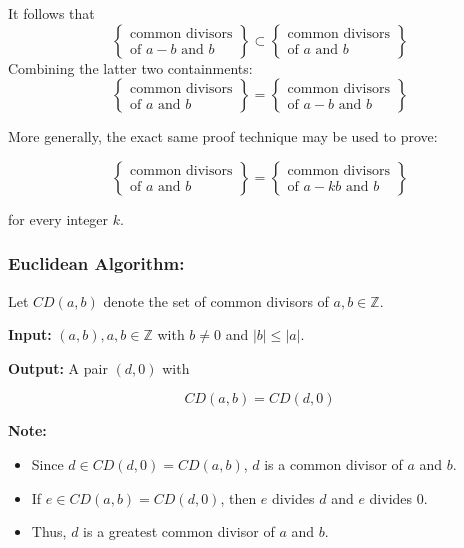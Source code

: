 \documentclass[11pt]{article}
\begin{document}
It follows that
\[
    \left\{
    \begin{array}{l}
        \text{common divisors} \\
        \text{of } a - b \text{ and } b
    \end{array}
    \right\}
    \subset
    \left\{
    \begin{array}{l}
        \text{common divisors} \\
        \text{of } a \text{ and } b
    \end{array}
    \right\}
\]
Combining the latter two containments:
\[
    \left\{
    \begin{array}{l}
        \text{common divisors} \\
        \text{of } a \text{ and } b
    \end{array}
    \right\}
    =
    \left\{
    \begin{array}{l}
        \text{common divisors} \\
        \text{of } a - b \text{ and } b
    \end{array}
    \right\}
\]

More generally, the exact same proof technique may be used to prove:

\[
    \left\{
    \begin{array}{l}
        \text{common divisors} \\
        \text{of } a \text{ and } b
    \end{array}
    \right\}
    =
    \left\{
    \begin{array}{l}
        \text{common divisors} \\
        \text{of } a - kb \text{ and } b
    \end{array}
    \right\}
\]

for every integer $k$.

\subsubsection{Euclidean Algorithm:}

Let $CD(a, b)$ denote the set of common divisors of $a, b \in \mathbb{Z}$.

\textbf{Input:} $(a, b), a, b \in \mathbb{Z}$ with $b \neq 0$ and $|b| \leq |a|$.

\textbf{Output:} A pair $(d, 0)$ with

\[
    CD(a, b) = CD(d, 0)
\]

\textbf{Note:}
\begin{itemize}
    \item Since $d \in CD(d, 0) = CD(a, b)$, $d$ is a common divisor of $a$ and $b$.
    \item If $e \in CD(a, b) = CD(d, 0)$, then $e$ divides $d$ and $e$ divides $0$.
    \item Thus, $d$ is a greatest common divisor of $a$ and $b$.
\end{itemize}
\end{document}
